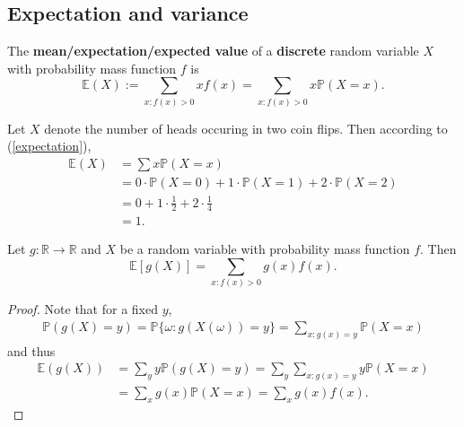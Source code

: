 \documentclass[11pt,singlecolumn, openany, citestyle=authoryear]{elegantbook}
\begin{document}
\begin{CJK}{UTF8}{gbsn}
\section{Expectation and variance}
\begin{definition}
    The \textbf{mean/expectation/expected value} of a \textbf{discrete} random variable $X$ with probability
    mass function $f$ is 
    \begin{equation}\label{expectation}
        \mathbb{E}(X) := \sum_{x:f(x)>0}xf(x)=\sum_{x:f(x)>0}x\mathbb{P}(X=x).
    \end{equation}
\end{definition}
\begin{example}
    Let $X$ denote the number of heads occuring in two coin flips.
    Then according to (\ref{expectation}),
    \begin{align*}
        \mathbb{E}(X) & = \sum x\mathbb{P}(X=x)\\
        &=0\cdot \mathbb{P}(X=0) + 1\cdot \mathbb{P}(X=1) + 2\cdot \mathbb{P}(X=2)\\
        &= 0 + 1\cdot \frac{1}{2} + 2 \cdot \frac{1}{4}\\
        &=1.
    \end{align*}
\end{example}
\begin{lemma}
    Let $g:\mathbb{R}\to \mathbb{R}$ and $X$ be a random variable with probability
    mass function $f$. Then 
    $$
    \mathbb{E}[g(X)] = \sum_{x:f(x)>0}g(x)f(x).
    $$
\end{lemma}
\begin{proof}
    Note that for a fixed $y$,
    \begin{align*}
        \mathbb{P}(g(X)=y) = \mathbb{P}\{\omega:g(X(\omega))=y\}
        = \sum_{x:g(x)=y}\mathbb{P}(X=x)
    \end{align*}
    and thus 
    \begin{align*}
        \mathbb{E}(g(X))& =\sum_{y} y\mathbb{P}(g(X)=y)= \sum_y \sum_{x:g(x)=y}y\mathbb{P}(X=x)\\
        &=\sum_x g(x)\mathbb{P}(X=x) = \sum_x g(x)f(x).
    \end{align*}
\end{proof}


\end{CJK}
\end{document}
